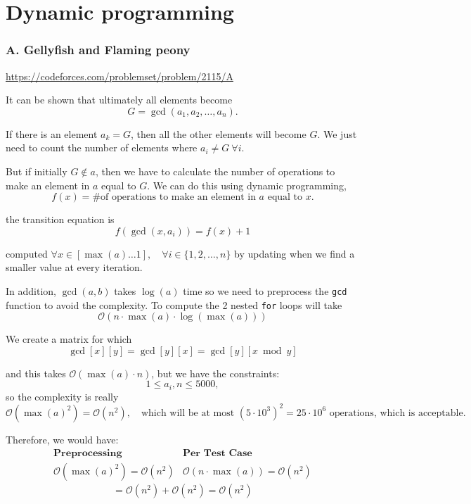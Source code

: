 \chapter{Dynamic programming}

\subsection{A. Gellyfish and Flaming peony}
\begin{sloppypar}
\url{https://codeforces.com/problemset/problem/2115/A} 
\end{sloppypar}

It can be shown that ultimately all elements become 
$$ G = \gcd(a_1, a_2, \ldots, a_n). $$
\begin{obs}
If there is an element \( a_k = G \), then all the other elements will become \( G \).  
We just need to count the number of elements where \( a_i \neq G \ \forall i \).
\end{obs}

But if initially \( G \notin a \), then we have to calculate the number of operations to make an element in \( a \) equal to \( G \).  
We can do this using dynamic programming,
$$ f(x) = \text{\# of operations to make an element in } a \text{ equal to } x. $$

the transition equation is
$$ f(\gcd(x, a_i)) = f(x) + 1 $$

computed \( \forall x \in [\max(a) \dots 1], \quad \forall i \in \{1, 2, \ldots, n\} \)  
by updating when we find a smaller value at every iteration.

In addition, \( \gcd(a, b) \) takes \( \log(a) \) time so we need to preprocess the \texttt{gcd} function to avoid the complexity. To compute the 2 nested \texttt{for} loops will take
\[
\mathcal{O}(n \cdot \max(a) \cdot \log(\max(a)))
\]

We create a matrix for which
$$ \gcd[x][y] = \gcd[y][x] = \gcd[y][x \bmod y] $$

and this takes \( \mathcal{O}(\max(a) \cdot n) \), but we have the constraints:  
$$ 1 \leq a_i, n \leq 5000, $$
so the complexity is really  
\[
\mathcal{O}(\max(a)^2) = \mathcal{O}(n^2), \quad \text{which will be at most } (5 \cdot 10^3)^2 = 25 \cdot 10^6 \text{ operations, which is acceptable.}
\]

Therefore, we would have:
\[
\begin{array}{c|c}
\textbf{Preprocessing} & \textbf{Per Test Case} \\
\hline
\mathcal{O}(\max(a)^2) = \mathcal{O}(n^2) & \mathcal{O}(n \cdot \max(a)) = \mathcal{O}(n^2)
\end{array}
\]
\[
= \mathcal{O}(n^2) + \mathcal{O}(n^2) = \mathcal{O}(n^2)
\]

